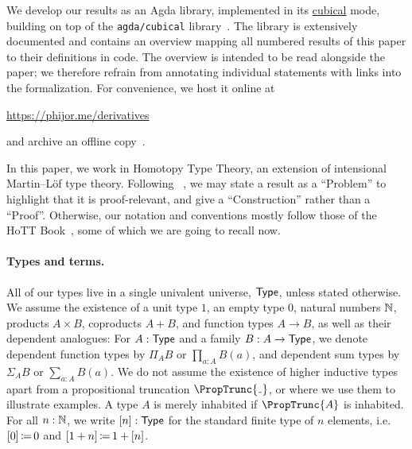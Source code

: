 We develop our results as an Agda library,
implemented in its \href{https://agda.readthedocs.io/en/v2.8.0/language/cubical.html}{cubical} mode,
building on top of the \texttt{agda/cubical} library~\cite{AgdaCommunity2025CubicalAgdaLibrary}.
The library is extensively documented and contains an overview mapping all numbered results of this paper to their definitions in code.
The overview is intended to be read alongside the paper;
we therefore refrain from annotating individual statements with links into the formalization.
For convenience, we host it online at
\begin{center}
  \url{https://phijor.me/derivatives}
\end{center}
and archive an offline copy~\cite{JoramVeltri2026DerivativesContainersUnivalent}.

In this paper, we work in Homotopy Type Theory, an extension of intensional Martin--Löf type theory.
Following \citeauthor{AhrensEtAl2018Categoricalstructurestype}~\cites{AhrensEtAl2018Categoricalstructurestype}{AhrensLumsdaine2019DisplayedCategories},
we may state a result as a \enquote{Problem} to highlight that it is proof-relevant,
and give a \enquote{Construction} rather than a \enquote{Proof}.
Otherwise, our notation and conventions mostly follow those of the HoTT Book~\cite{UnivalentFoundationsProgram2013HomotopyTypeTheory},
some of which we are going to recall now.

\paragraph{Types and terms.}
All of our types live in a single univalent universe, \( \operatorname{\mathsf{Type}} \), unless stated otherwise.
We assume the existence of a unit type \( 1 \), an empty type \( 0 \), natural numbers \( \operatorname{\mathbb{N}} \), products \( A \times B \), coproducts \( A + B \), and function types \( A \to B \),
as well as their dependent analogues:
For \( A : \operatorname{\mathsf{Type}} \) and a family \( B : A \to \operatorname{\mathsf{Type}} \),
we denote dependent function types by \( \Pi_{A} B \) or \( \prod_{a : A} B(a) \),
and dependent sum types by \( \Sigma_{A} B \) or \( \sum_{a : A} B(a) \).
We do not assume the existence of higher inductive types apart from a propositional truncation \( \PropTrunc{\Blank} \),
or where we use them to illustrate examples.
A type \( A \) is merely inhabited if \( \PropTrunc{A} \) is inhabited.
For all \( n : \operatorname{\mathbb{N}} \), we write \( \lbrack n\rbrack : \operatorname{\mathsf{Type}} \) for the standard finite type of \( n \) elements,
i.e. \( \lbrack0\rbrack \operatorname{\mathrel{\coloneq}} 0 \) and \( \lbrack1+n\rbrack \operatorname{\mathrel{\coloneq}} 1 + \lbrack n\rbrack \).

